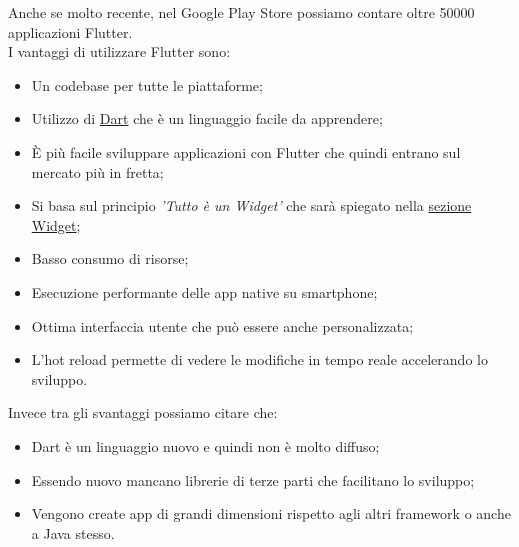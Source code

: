 \newpage
Anche se molto recente, nel Google Play Store possiamo contare oltre 50000 applicazioni Flutter.\\
I vantaggi di utilizzare Flutter sono:
\begin{itemize}
	\item Un codebase per tutte le piattaforme; 
	\item Utilizzo di \hyperref[sec:Dart]{Dart} che è un linguaggio facile da apprendere;  
	\item È più facile sviluppare applicazioni con Flutter che quindi entrano sul mercato più in fretta;
	\item Si basa sul principio \textit{'Tutto è un Widget'} che sarà spiegato nella \hyperref[sec:Widget]{sezione Widget};
	\item Basso consumo di risorse;
	\item Esecuzione performante delle app native su smartphone;
	\item Ottima interfaccia utente che può essere anche personalizzata;
	\item L’hot reload permette di vedere le modifiche in tempo reale accelerando lo sviluppo.\\
\end{itemize}
Invece tra gli svantaggi possiamo citare che:
\begin{itemize}
	\item Dart è un linguaggio nuovo e quindi non è molto diffuso; 
	\item Essendo nuovo mancano librerie di terze parti che facilitano lo sviluppo;  
	\item Vengono create app di grandi dimensioni rispetto agli altri framework o anche a Java stesso.\\
\end{itemize}
